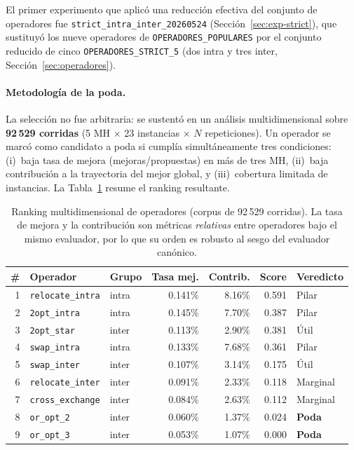 El primer experimento que aplicó una reducción efectiva del conjunto de
operadores fue \texttt{strict\_intra\_inter\_20260524}
(Sección~\ref{sec:exp-strict}), que sustituyó los nueve operadores de
\texttt{OPERADORES\_POPULARES} por el conjunto reducido de cinco
\texttt{OPERADORES\_STRICT\_5} (dos intra y tres inter,
Sección~\ref{sec:operadores}).

\paragraph{Metodología de la poda.}
La selección no fue arbitraria: se sustentó en un análisis multidimensional
sobre \textbf{92\,529 corridas} (5 MH $\times$ 23 instancias $\times$ $N$
repeticiones). Un operador se marcó como candidato a poda si cumplía
simultáneamente tres condiciones: (i)~baja tasa de mejora
(mejoras/propuestas) en más de tres MH, (ii)~baja contribución a la
trayectoria del mejor global, y (iii)~cobertura limitada de instancias. La
Tabla~\ref{tab:poda-ranking} resume el ranking resultante.

\begin{table}[h]
\centering
\caption{Ranking multidimensional de operadores (corpus de 92\,529 corridas).
         La tasa de mejora y la contribución son métricas \emph{relativas}
         entre operadores bajo el mismo evaluador, por lo que su orden es
         robusto al sesgo del evaluador canónico.}
\label{tab:poda-ranking}
\small
\begin{tabular}{rllrrrl}
\toprule
\# & Operador & Grupo & Tasa mej. & Contrib. & Score & Veredicto \\
\midrule
1 & \texttt{relocate\_intra} & intra & 0.141\% & 8.16\% & 0.591 & Pilar \\
2 & \texttt{2opt\_intra}     & intra & 0.145\% & 7.70\% & 0.387 & Pilar \\
3 & \texttt{2opt\_star}      & inter & 0.113\% & 2.90\% & 0.381 & Útil \\
4 & \texttt{swap\_intra}     & intra & 0.133\% & 7.68\% & 0.361 & Pilar \\
5 & \texttt{swap\_inter}     & inter & 0.107\% & 3.14\% & 0.175 & Útil \\
6 & \texttt{relocate\_inter} & inter & 0.091\% & 2.33\% & 0.118 & Marginal \\
7 & \texttt{cross\_exchange} & inter & 0.084\% & 2.63\% & 0.112 & Marginal \\
8 & \texttt{or\_opt\_2}      & inter & 0.060\% & 1.37\% & 0.024 & \textbf{Poda} \\
9 & \texttt{or\_opt\_3}      & inter & 0.053\% & 1.07\% & 0.000 & \textbf{Poda} \\
\bottomrule
\end{tabular}
\end{table}

